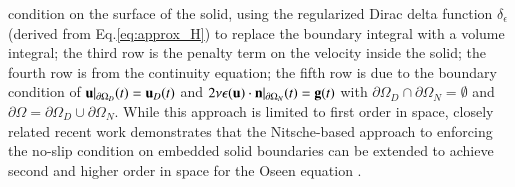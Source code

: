 \documentclass[final,3p,times]{elsarticle}
\newcommand{\bg}{\mathbf{g}}
\begin{document}
condition on the surface of the solid, using the regularized Dirac delta function $\delta_{\epsilon}$ (derived from Eq.\eqref{eq:approx_H}) to replace the boundary integral with a volume integral; the third row is the penalty term on the velocity inside 
the solid; the fourth row is from the continuity equation; the fifth row is due to the boundary condition of $\mathbf{u}|_{\partial\Omega_D}(t)=\mathbf{u}_D(t)$ and $2\nu\epsilon(\bu)\cdot\bn|_{\partial\Omega_N}(t)=\bg(t)$ with $\partial\Omega_D\cap\partial\Omega_N=\emptyset$ and  $\partial\Omega=\partial\Omega_D\cup\partial\Omega_N$. While this approach is limited to first order in space, closely related recent work demonstrates that the Nitsche-based approach to enforcing the no-slip condition on embedded solid boundaries can be extended to achieve second and higher order in space for the Oseen equation \cite{massingStabilizedNitscheCut2018}.
\end{document}
